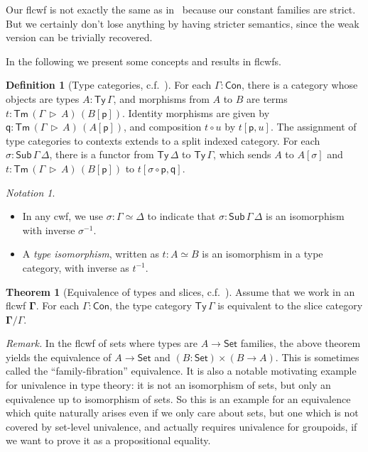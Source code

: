 \documentclass[12pt,a4paper,twoside,openany]{book}
\theoremstyle{remark}
\newtheorem{notation}{Notation}
\theoremstyle{definition}
\newtheorem{mydefinition}{Definition}
\theoremstyle{theorem}
\newtheorem{theorem}{Theorem}
\newcommand{\bs}[1]{\boldsymbol{#1}}
\newcommand{\Con}{\mathsf{Con}}
\newcommand{\Sub}{\mathsf{Sub}}
\newcommand{\Tm}{\mathsf{Tm}}
\newcommand{\Ty}{\mathsf{Ty}}
\newcommand{\Set}{\mathsf{Set}}
\newcommand{\ext}{\triangleright}
\newcommand{\p}{\mathsf{p}}
\newcommand{\q}{\mathsf{q}}
\newcommand{\bGamma}{\bs{\Gamma}}
\begin{document}
Our flcwf is not exactly the same as in \cite{clairambault2014biequivalence}\,
because our constant families are strict. But we certainly don't lose anything
by having stricter semantics, since the weak version can be trivially
recovered.

In the following we present some concepts and results in flcwfs.

\begin{mydefinition}[Type categories, c.f.\ {\cite[Section 2.2]{clairambault2014biequivalence}}]
\label{def:type_categories} For each $\Gamma : \Con$, there is a category
whose objects are types $A : \Ty\,\Gamma$, and morphisms from $A$ to $B$ are
terms $t : \Tm\,(\Gamma\,\ext\,A)\,(B[\p])$. Identity morphisms are given by $\q
: \Tm\,(\Gamma\,\ext\,A)\,(A[\p])$, and composition $t \circ u$ by $t[\p,
  u]$. The assignment of type categories to contexts extends to a split indexed
category. For each $\sigma : \Sub\,\Gamma\,\Delta$, there is a functor from
$\Ty\,\Delta$ to $\Ty\,\Gamma$, which sends $A$ to $A[\sigma]$ and $t :
\Tm\,(\Gamma\,\ext\,A)\,(B[\p])$ to $t[\sigma\circ \p, \q]$.
\end{mydefinition}

\begin{notation}
  ~\\
  \begin{itemize}
  \item  \vspace{-1.7em}
         In any cwf, we use $\sigma : \Gamma \simeq \Delta$ to indicate
         that $\sigma : \Sub\,\Gamma\,\Delta$ is an isomorphism with inverse $\sigma^{-1}$.
    \item A \emph{type isomorphism}, written as $t : A \simeq B$ is an isomorphism in a
         type category, with inverse as $t^{-1}$.
  \end{itemize}
\end{notation}

\begin{theorem}[Equivalence of types and slices, c.f.\ {\cite[Section 2.2]{clairambault2014biequivalence}}]
Assume that we work in an flcwf $\bGamma$. For each $\Gamma : \Con$, the type
category $\Ty\,\Gamma$ is equivalent to the slice category $\bGamma/\Gamma$.
\end{theorem}

\emph{Remark.} In the flcwf of sets where types are $A \to \Set$ families, the
above theorem yields the equivalence of $A \to \Set$ and $(B : \Set) \times (B
\to A)$. This is sometimes called the ``family-fibration'' equivalence. It is
also a notable motivating example for univalence in type theory: it is not an
isomorphism of sets, but only an equivalence up to isomorphism of sets. So this
is an example for an equivalence which quite naturally arises even if we only
care about sets, but one which is not covered by set-level univalence, and
actually requires univalence for groupoids, if we want to prove it as a
propositional equality.
\end{document}
